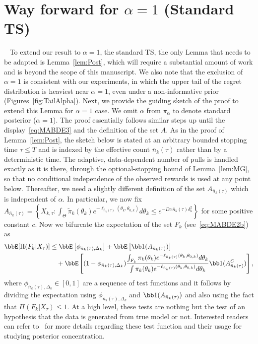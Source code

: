 \documentclass[11pt]{article}
\begin{document}
\section{Way forward for $\alpha=1$ (Standard TS)}~\label{app:StanTS}
To extend our result to $\alpha=1$, the standard TS, the only Lemma that needs to be adapted is Lemma~\ref{lem:Post}, which will require a substantial amount of work and is beyond the scope of this manuscript. We also note that the exclusion of $\alpha = 1$ is consistent with our experiments, in which the upper tail of the regret distribution is heaviest near $\alpha = 1$, even under a non-informative prior (Figures~\ref{fig:TailAlpha}). Next, we provide the guiding sketch of the proof to extend this Lemma for $\alpha=1$ case. We omit $\alpha$ from $\pi_{\alpha}$ to denote standard posterior ($\alpha=1$). The proof essentially follows similar steps up until the display~\eqref{eq:MABDE3} and the definition of the set $A$. As in the proof of Lemma~\ref{lem:Post}, the sketch below is stated at an arbitrary bounded stopping time $\tau \leq T$ and is indexed by the effective count $\bar n_k(\tau)$ rather than by a deterministic time. The adaptive, data-dependent number of pulls is handled exactly as it is there, through the optional-stopping bound of Lemma~\ref{lem:MG}, so that no conditional independence of the observed rewards is used at any point below. Thereafter, we need a slightly different definition of the set $A_{\bar n_k(\tau)}$ which is independent of $\alpha$. In particular, we now fix $A_{\bar n_k(\tau)} = \left\{ X_{k,\tau}: \int_{\Theta} \tilde \pi_k(\theta_k) e^{-\ell_{\bar n_k(\tau)}(\theta_k,\theta_{0,k})}d\theta_k \leq  e^{-D c\, \bar n_k(\tau)\delta_k^2}  \right\}$ for some positive constant $c$. Now we bifurcate the expectation of the set $F_k$ (see~\eqref{eq:MABDE2b}) as
\begin{align}
\nonumber
 \bbE [\Pi(F_k|X_{\tau})] &\leq  \bbE\left[\phi_{\bar n_k(\tau),\Delta_k}\right] + \bbE\left[\bb1(A_{\bar n_k(\tau)})\right] 
 \\
 &\quad + \bbE \left[ (1-\phi_{\bar n_k(\tau),\Delta_k})  \frac{\int_{F_k} \pi_k(\theta_k) e^{- \ell_{\bar n_k(\tau)}(\theta_k,\theta_{0,k})}d\theta_k} {\int \pi_k(\theta_k) e^{- \ell_{\bar n_k(\tau)}(\theta_k,\theta_{0,k})}d\theta_k } \bb1(A_{\bar n_k(\tau)}^C) \right],
 \label{eq:MABDE4C}
\end{align}
where $\phi_{\bar n_k(\tau),\Delta_k} \in [0,1]$ are a sequence of test functions and it follows by dividing the expectation using $\phi_{\bar n_k(\tau),\Delta_k}$ and $\bb1(A_{\bar n_k(\tau)})$ and also using the fact that $\Pi(F_k|X_{\tau})\leq 1$. At a high level, these tests are nothing but the test of an hypothesis that the data is generated from true model or not.  
Interested readers can refer to~\citep{Sc1965,GGV,ZG} for more details regarding these test function and their usage for studying posterior concentration.
\end{document}
